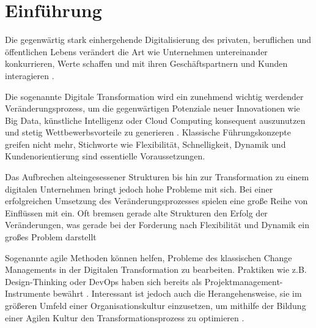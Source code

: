 \chapter{Einführung}

Die gegenwärtig stark einhergehende Digitalisierung des privaten, beruflichen und öffentlichen Lebens verändert die Art wie Unternehmen untereinander konkurrieren, Werte schaffen und mit ihren Geschäftspartnern und Kunden interagieren \cite[S. 1]{oswald_digitale_2018}.

Die sogenannte Digitale Transformation wird ein zunehmend wichtig werdender Veränderungsprozess, um die gegenwärtigen Potenziale neuer Innovationen wie Big Data, künstliche Intelligenz oder Cloud Computing konsequent auszunutzen und stetig Wettbewerbsvorteile zu generieren \cite[S. 2]{oswald_digitale_2018}. Klassische Führungskonzepte greifen nicht mehr, Stichworte wie Flexibilität, Schnelligkeit, Dynamik und Kundenorientierung sind essentielle Voraussetzungen. 

Das Aufbrechen alteingesessener Strukturen bis hin zur Transformation zu einem digitalen Unternehmen bringt jedoch hohe Probleme mit sich. Bei einer erfolgreichen Umsetzung des Veränderungsprozesses spielen eine große Reihe von Einflüssen mit ein. Oft bremsen gerade alte Strukturen den Erfolg der Veränderungen, was gerade bei der Forderung nach Flexibilität und Dynamik ein großes Problem darstellt
\cite[S. 196]{appelfeller_digitale_2018}


Sogenannte agile Methoden können helfen, Probleme des klassischen Change Managements in der Digitalen Transformation zu bearbeiten. Praktiken wie z.B. Design-Thinking oder DevOps haben sich bereits als Projektmanagement-Instrumente bewährt \cite[S. 7]{deeken_agiles_2018}. Interessant ist jedoch auch die Herangehensweise, sie im größeren Umfeld einer Organisationskultur einzusetzen, um mithilfe der Bildung einer Agilen Kultur den Transformationsprozess zu optimieren \cite[S. 140]{hofert_agiler_2016}.


